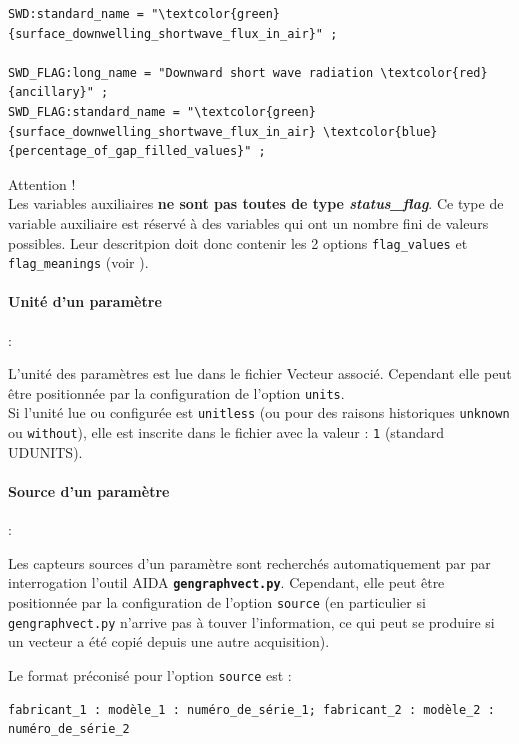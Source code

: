 \begin{Verbatim}[fontsize=\myfontsize, commandchars=\\\{\}]
SWD:standard_name = "\textcolor{green}{surface_downwelling_shortwave_flux_in_air}" ;

SWD_FLAG:long_name = "Downward short wave radiation \textcolor{red}{ancillary}" ;
SWD_FLAG:standard_name = "\textcolor{green}{surface_downwelling_shortwave_flux_in_air} \textcolor{blue}{percentage_of_gap_filled_values}" ;
\end{Verbatim}

\begin{warning}
Attention ! \\
Les variables auxiliaires \textbf{ne sont pas toutes de type
\textit{status\_flag}}. Ce type de variable auxiliaire est réservé à des
variables qui ont un nombre fini de valeurs possibles. Leur descritpion
doit donc contenir les 2 options \texttt{flag\_values} et
\texttt{flag\_meanings} (voir ).
\end{warning}


\paragraph{Unité d'un paramètre} : \label{ref:units}

L'unité des paramètres est lue dans le fichier Vecteur associé.
Cependant elle peut être positionnée par la configuration de l'option
\texttt{units}.\\
Si l'unité lue ou configurée est \texttt{unitless} (ou pour des raisons
historiques \texttt{unknown} ou \texttt{without}), elle est inscrite dans le
fichier \netcdf avec la valeur : \texttt{1} (standard UDUNITS).


\paragraph{Source d'un paramètre} : \label{ref:source}

Les capteurs sources d'un paramètre sont recherchés automatiquement par
\prodcdf par interrogation l'outil AIDA
\textbf{\texttt{gengraphvect.py}}. Cependant, elle peut être positionnée par la
configuration de l'option \texttt{source} (en particulier si
\texttt{gengraphvect.py} n'arrive pas à touver l'information, ce qui
peut se produire si un vecteur a été copié depuis une autre
acquisition).
\medbreak

Le format préconisé pour l'option \texttt{source} est :\\
\begin{Verbatim}[fontsize=\myfontsize]
fabricant_1 : modèle_1 : numéro_de_série_1; fabricant_2 : modèle_2 : numéro_de_série_2
\end{Verbatim}

